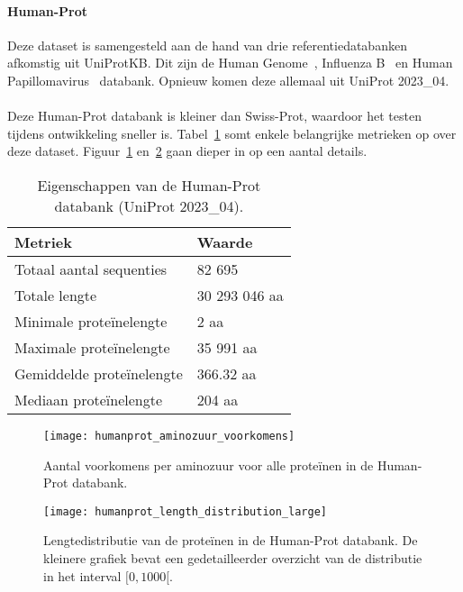 \paragraph{Human-Prot} Deze dataset is samengesteld aan de hand van drie referentiedatabanken afkomstig uit UniProtKB\@.
Dit zijn de Human Genome~\cite{proteomes_homo_sapiens}, Influenza B~\cite{proteomes_infuenza_b} en Human Papillomavirus~\cite{proteomes_human_papillomavirus} databank.
Opnieuw komen deze allemaal uit UniProt 2023\_04.
\\ \\
Deze Human-Prot databank is kleiner dan Swiss-Prot, waardoor het testen tijdens ontwikkeling sneller is.
Tabel~\ref{tab:humanprot_eigenschappen} somt enkele belangrijke metrieken op over deze dataset.
Figuur~\ref{fig:humanprot_aminozuur} en~\ref{fig:humanprot_length} gaan dieper in op een aantal details.

\begin{table}[h!]
    \centering
    \begin{tabular}{ l l }
        Metriek                   & Waarde        \\
        \hline\hline
        Totaal aantal sequenties  & 82 695        \\
        Totale lengte             & 30 293 046 aa \\
        Minimale proteïnelengte   & 2 aa          \\
        Maximale proteïnelengte   & 35 991 aa     \\
        Gemiddelde proteïnelengte & 366.32 aa     \\
        Mediaan proteïnelengte    & 204 aa        \\
        \hline
    \end{tabular}
    \caption{Eigenschappen van de Human-Prot databank (UniProt 2023\_04).}
    \label{tab:humanprot_eigenschappen}
\end{table}

\begin{figure}[H]
    \centering
    \texttt{[image: humanprot\_aminozuur\_voorkomens]}
    \caption{Aantal voorkomens per aminozuur voor alle proteïnen in de Human-Prot databank.}
    \label{fig:humanprot_aminozuur}
\end{figure}

\begin{figure}[h]
    \centering
    \texttt{[image: humanprot\_length\_distribution\_large]}
    \caption{Lengtedistributie van de proteïnen in de Human-Prot databank. De kleinere grafiek bevat een gedetailleerder overzicht van de distributie in het interval $[0, 1000[$.}\label{fig:humanprot_length}
\end{figure}

